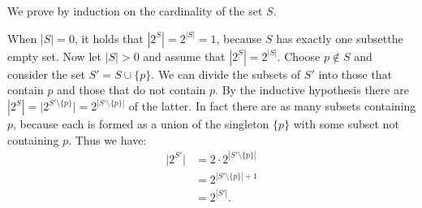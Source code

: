 \exercise
We prove by induction on the cardinality of the set $S$.

When $|S|=0$, it holds that $|2^S|=2^{|S|}=1$, because $S$ has exactly one subset\dash the empty set.
Now let $|S|>0$ and assume that $|2^S|=2^{|S|}$.
Choose $p\notin S$ and consider the set $S'=S\cup\{p\}$.
We can divide the subsets of $S'$ into those that contain $p$ and those that do not contain $p$.
By the inductive hypothesis there are $|2^S|=\bigl|2^{S'\setminus\{p\}}\bigr|=2^{|S'\setminus\{p\}|}$ of the latter.
In fact there are as many subsets containing $p$, because each is formed as a union of the singleton $\{p\}$ with some subset not containing $p$.
Thus we have:
\begin{align*}
    \bigl|2^{S'}\bigr| &= 2\cdot2^{|S'\setminus\{p\}|} \\
    &= 2^{|S'\setminus\{p\}|+1} \\
    &= 2^{|S'|}.
\end{align*}
